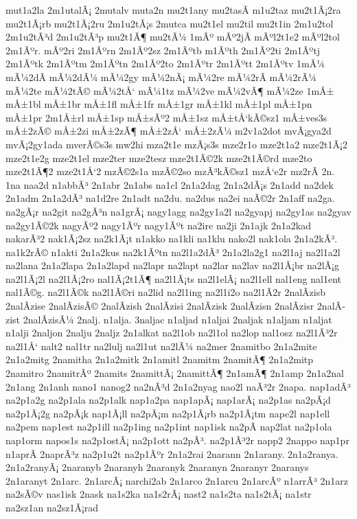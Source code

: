 {mut1a2la
2m1utalÃ¡
2mutalv
muta2n
mu2t1any
mu2tasÃ­
m1u2taz
mu2t1Ã¡2ra
mu2t1Ã¡rb
mu2t1Ã¡2ru
2m1u2tÃ¡s
2mutca
mu2t1el
mu2til
mu2t1in
2m1u2tol
2m1u2tÃ³d
2m1u2tÃ³p
mu2t1Ã¶
mu2tÃ¼
1mÃº
mÃº2jÃ­
mÃºl2t1e2
mÃºl2tol
2m1Ãºr.
mÃº2ri
2m1Ãºrn
2m1Ãº2sz
2m1Ãºtb
m1Ãºth
2m1Ãº2ti
2m1Ãºtj
2m1Ãºtk
2m1Ãºtm
2m1Ãºtn
2m1Ãº2to
2m1Ãºtr
2m1Ãºtt
2m1Ãºtv
1mÃ¼
mÃ¼2dÃ­
mÃ¼2dÃ¼
mÃ¼2gy
mÃ¼2nÃ¡
mÃ¼2re
mÃ¼2rÃ­
mÃ¼2rÃ¼
mÃ¼2te
mÃ¼2tÃ©
mÃ¼2tÅ‘
mÃ¼1tz
mÃ¼2ve
mÃ¼2vÃ¶
mÃ¼2ze
1mÅ±
mÅ±1bl
mÅ±1br
mÅ±1fl
mÅ±1fr
mÅ±1gr
mÅ±1kl
mÅ±1pl
mÅ±1pn
mÅ±1pr
2m1Å±rl
mÅ±1sp
mÅ±sÃº2
mÅ±1sz
mÅ±tÅ‘kÃ©sz1
mÅ±ves3s
mÅ±2zÃ©
mÅ±2zi
mÅ±2zÃ¶
mÅ±2zÅ‘
mÅ±2zÃ¼
m2v1a2dot
mvÃ¡gya2d
mvÃ¡2gy1ada
mverÃ©s3s
mw2hi
mza2t1e
mzÃ¡s3s
mze2r1o
mze2t1a2
mze2t1Ã¡2
mze2t1e2g
mze2t1el
mze2ter
mze2tesz
mze2t1Ã©2k
mze2t1Ã©rd
mze2to
mze2t1Ã¶2
mze2t1Å‘2
mzÃ©2s1a
mzÃ©2so
mzÃ³kÃ©sz1
mzÅ‘e2r
mz2rÃ­
2n.
1na
naa2d
n1abbÃ³
2n1abr
2n1abs
na1cl
2n1a2dag
2n1a2dÃ¡s
2n1add
na2dek
2n1adm
2n1a2dÃ³
na1d2re
2n1adt
na2du.
na2dus
na2ei
naÃ©2r
2n1aff
na2ga.
na2gÃ¡r
na2git
na2gÃ³n
na1grÃ¡
nagy1agg
na2gy1a2l
na2gyapj
na2gy1as
na2gyav
na2gy1Ã©2k
nagyÃº2
nagy1Ãºr
nagy1Ãºt
na2ire
na2ji
2n1ajk
2n1a2kad
nakarÃ³2
nak1Ã¡2sz
na2k1Ã¡t
n1akko
na1kli
na1klu
nako2l
nak1ola
2n1a2kÃ³.
na1k2rÃ©
n1akti
2n1a2kus
na2k1Ãºtn
na2l1a2dÃ³
2n1a2la2g1
na2l1aj
na2l1a2l
na2lana
2n1a2lapa
2n1a2lapd
na2lapr
na2lapt
na2lar
na2lav
na2l1Ã¡br
na2lÃ¡g
na2l1Ã¡2l
na2l1Ã¡2ro
nal1Ã¡2t1Ã¶
na2l1Ã¡ts
na2l1elÃ¡
na2l1ell
nal1eng
nal1ent
nal1Ã©g.
na2l1Ã©k
na2l1Ã©ri
na2lid
na2l1ing
na2l1i2o
na2l1Ã­2r
2nalÃ­zisb
2nalÃ­zise
2nalÃ­zisÃ©
2nalÃ­zish
2nalÃ­zisi
2nalÃ­zisk
2nalÃ­zisn
2nalÃ­zisr
2nalÃ­zist
2nalÃ­zisÃ¼
2nalj.
n1alja.
3naljac
n1aljad
n1aljai
2naljak
n1aljam
n1aljat
n1alji
2naljon
2nalju
2naljz
2n1alkat
na2l1ob
na2l1ol
na2lop
nal1osz
na2l1Ã³2r
na2l1Å‘
nalt2
nal1tr
na2lulj
na2l1ut
na2lÃ¼
na2mer
2namitbo
2n1a2mite
2n1a2mitg
2namitha
2n1a2mitk
2n1amitl
2namitm
2namitÃ¶
2n1a2mitp
2namitro
2namitrÃº
2namits
2namittÃ¡
2namittÃ¶
2n1amÃ¶
2n1amp
2n1a2nal
2n1ang
2n1anh
nano1
nanog2
na2nÃ³d
2n1a2nyag
nao2l
naÃ³2r
2napa.
nap1adÃ³
na2p1a2g
na2p1ala
na2p1alk
nap1a2pa
nap1apÃ¡
nap1arÃ¡
na2p1as
na2pÃ¡d
na2p1Ã¡2g
na2pÃ¡k
nap1Ã¡ll
na2pÃ¡m
na2p1Ã¡rb
na2p1Ã¡tm
nape2l
nap1ell
na2pem
nap1est
na2p1ill
na2p1ing
na2p1int
nap1isk
na2pÃ­
nap2lat
na2p1ola
nap1orm
napos1s
na2p1ostÃ¡
na2p1ott
na2pÃ³.
na2p1Ã³2r
napp2
2nappo
nap1pr
n1aprÃ­
2naprÃ³z
na2p1u2t
na2p1Ãºr
2n1a2rai
2narann
2n1arany.
2n1a2ranya.
2n1a2ranyÃ¡
2naranyb
2naranyh
2naranyk
2naranyn
2naranyr
2naranys
2n1aranyt
2n1arc.
2n1arcÃ¡
narchi2ab
2n1arco
2n1arcu
2n1arcÃº
n1arrÃ³
2n1arz
na2sÃ©v
nas1isk
2nask
na1s2ka
na1s2rÃ¡
nast2
na1s2ta
na1s2tÃ¡
na1str
na2sz1an
na2sz1Ã¡rad
}
